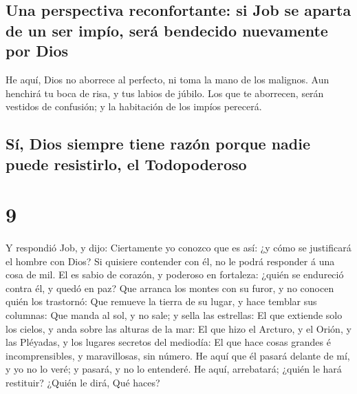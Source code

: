 \hypertarget{una-perspectiva-reconfortante-si-job-se-aparta-de-un-ser-impuxedo-seruxe1-bendecido-nuevamente-por-dios}{%
\subsection{Una perspectiva reconfortante: si Job se aparta de un ser
impío, será bendecido nuevamente por
Dios}\label{una-perspectiva-reconfortante-si-job-se-aparta-de-un-ser-impuxedo-seruxe1-bendecido-nuevamente-por-dios}}

 He aquí, Dios no aborrece al perfecto, ni toma la mano
de los malignos.  Aun henchirá tu boca de risa, y tus
labios de júbilo.  Los que te aborrecen, serán vestidos
de confusión; y la habitación de los impíos perecerá.

\hypertarget{suxed-dios-siempre-tiene-razuxf3n-porque-nadie-puede-resistirlo-el-todopoderoso}{%
\subsection{Sí, Dios siempre tiene razón porque nadie puede resistirlo,
el
Todopoderoso}\label{suxed-dios-siempre-tiene-razuxf3n-porque-nadie-puede-resistirlo-el-todopoderoso}}

\hypertarget{section-8}{%
\section{9}\label{section-8}}

 Y respondió Job, y dijo:  Ciertamente yo
conozco que es así: ¿y cómo se justificará el hombre con Dios?
 Si quisiere contender con él, no le podrá responder á una
cosa de mil.  El es sabio de corazón, y poderoso en
fortaleza: ¿quién se endureció contra él, y quedó en paz? 
Que arranca los montes con su furor, y no conocen quién los trastornó:
 Que remueve la tierra de su lugar, y hace temblar sus
columnas:  Que manda al sol, y no sale; y sella las
estrellas:  El que extiende solo los cielos, y anda sobre
las alturas de la mar:  El que hizo el Arcturo, y el
Orión, y las Pléyadas, y los lugares secretos del mediodía:
 El que hace cosas grandes é incomprensibles, y
maravillosas, sin número.  He aquí que él pasará delante
de mí, y yo no lo veré; y pasará, y no lo entenderé.  He
aquí, arrebatará; ¿quién le hará restituir? ¿Quién le dirá, Qué haces?

